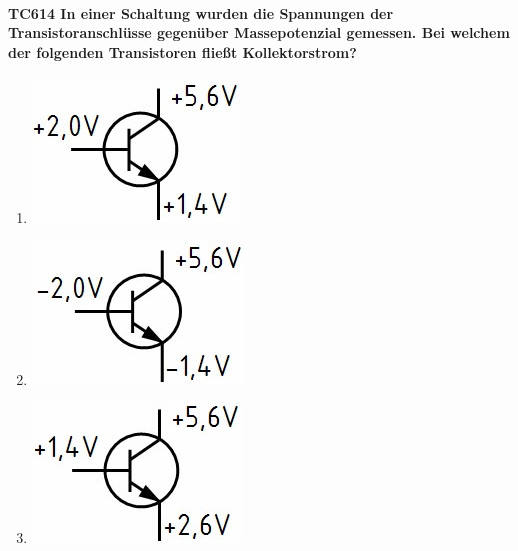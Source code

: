 \documentclass[8pt]{article}
\begin{document}
\begin{enumerate}
\begin{enumerate}[nolistsep,label=\Alph*]
{\begin{enumerate}[nolistsep,label=\Alph*]
\paragraph*{TC614 In einer Schaltung wurden die Spannungen der Transistoranschlüsse gegenüber Massepotenzial gemessen. Bei welchem der folgenden Transistoren fließt Kollektorstrom?}
\begin{enumerate}[nolistsep,label=\Alph*]
\item
	\begin{center}
		\begin{minipage}{\linewidth}
			\centering
			\includegraphics[scale=1.0]{pics/tc614_a.jpg}
		\end{minipage}
	\end{center}
\item
	\begin{center}
		\begin{minipage}{\linewidth}
			\centering
			\includegraphics[scale=1.0]{pics/tc614_b.jpg}
		\end{minipage}
	\end{center}
\item
	\begin{center}
		\begin{minipage}{\linewidth}
			\centering
			\includegraphics[scale=1.0]{pics/tc614_c.jpg}
		\end{minipage}

\end{center}
\end{enumerate}
\end{enumerate}}
\end{enumerate}
\end{enumerate}
\end{document}
